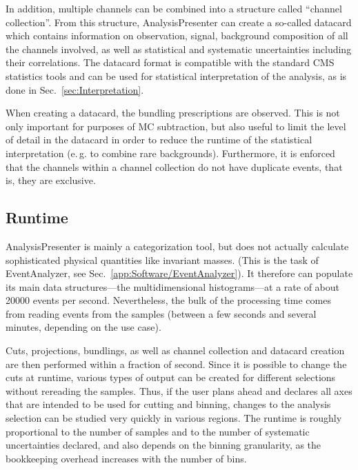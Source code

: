 In addition, multiple channels can be combined into a structure called ``channel collection''. From this structure, AnalysisPresenter can create a so-called datacard which contains information on observation, signal, background composition of all the channels involved, as well as statistical and systematic uncertainties including their correlations. The datacard format is compatible with the standard CMS statistics tools and can be used for statistical interpretation of the analysis, as is done in Sec.~\ref{sec:Interpretation}.

When creating a datacard, the bundling prescriptions are observed. This is not only important for purposes of MC subtraction, but also useful to limit the level of detail in the datacard in order to reduce the runtime of the statistical interpretation (e.\,g. to combine rare backgrounds). Furthermore, it is enforced that the channels within a channel collection do not have duplicate events, that is, they are exclusive.

\subsection{Runtime}
AnalysisPresenter is mainly a categorization tool, but does not actually calculate sophisticated physical quantities like invariant masses. (This is the task of EventAnalyzer, see Sec.~\ref{app:Software/EventAnalyzer}). It therefore can populate its main data structures\hairspace{}---\hairspace{}the multidimensional histograms\hairspace{}---\hairspace{}at a rate of about 20000 events per second. Nevertheless, the bulk of the processing time comes from reading events from the samples (between a few seconds and several minutes, depending on the use case).

Cuts, projections, bundlings, as well as channel collection and datacard creation are then performed within a fraction of second. Since it is possible to change the cuts at runtime, various types of output can be created for different selections without rereading the samples. Thus, if the user plans ahead and declares all axes that are intended to be used for cutting and binning, changes to the analysis selection can be studied very quickly in various regions. The runtime is roughly proportional to the number of samples and to the number of systematic uncertainties declared, and also depends on the binning granularity, as the bookkeeping overhead increases with the number of bins.
